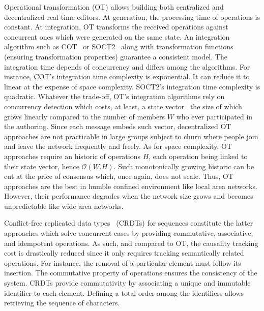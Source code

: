 \begin{asparadesc}
\item [Operational transformation] (OT) allows building both centralized and
  decentralized real-time editors. At generation, the processing time of
  operations is constant. At integration, OT transforms the received operations
  against concurrent ones which were generated on the same state. An integration
  algorithm such as COT~\cite{sun2009contextbased} or
  SOCT2~\cite{vidot2000copies} along with transformation functions (ensuring
  transformation properties) guarantee a consistent model. The integration time
  depends of concurrency and differs among the algorithms.  For instance, COT's
  integration time complexity is exponential. It can reduce it to linear at the
  expense of space complexity. SOCT2's integration time complexity is quadratic.
  Whatever the trade-off, OT's integration algorithms rely on concurrency
  detection which costs, at least, a state
  vector~\cite{charronbost1991concerning} the size of which grows linearly
  compared to the number of members $W$ who ever participated in the
  authoring. Since each message embeds such vector, decentralized OT approaches
  are not practicable in large groups subject to churn where people join and
  leave the network frequently and freely.  As for space complexity, OT
  approaches require an historic of operations $H$, each operation being linked
  to their state vector, hence $\mathcal{O}(W.H)$. Such monotonically growing
  historic can be cut at the price of consensus which, once again, does not
  scale. Thus, OT approaches are the best in humble confined environment like
  local area networks. However, their performance degrades when the network size
  grows and becomes unpredictable like wide area networks.

\item [Conflict-free replicated data types~\cite{shapiro2011comprehensive,
    shapiro2011conflict}] (CRDTs) for sequences constitute the latter approaches
  which solve concurrent cases by providing commutative, associative, and
  idempotent operations. As such, and compared to OT, the causality tracking
  cost is drastically reduced since it only requires tracking semantically
  related operations. For instance, the removal of a particular element must
  follow its insertion. The commutative property of operations ensures the
  consistency of the system. CRDTs provide commutativity by associating a unique
  and immutable identifier to each element. Defining a total order among the
  identifiers allows retrieving the sequence of characters.


\end{asparadesc}
